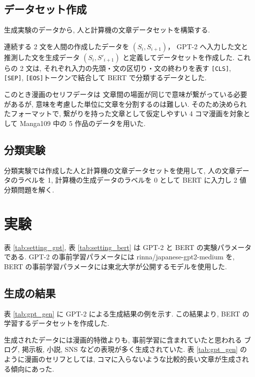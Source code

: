 \documentclass[twocolumn]{jarticle}     %
\begin{document}
\subsection{データセット作成}

生成実験のデータから, 人と計算機の文章データセットを構築する.

連続する 2 文を人間の作成したデータを $(S_i, S_{i+1})$，
GPT-2 へ入力した文と推測した文を生成データ $(S_i, S'_{i+1})$
と定義してデータセットを作成した.
これらの 2 文は, それぞれ入力の先頭・文の区切り・文の終わりを表す \verb|[CLS]|, \verb|[SEP]|, \verb|[EOS]|トークンで結合して BERT で分類するデータとした.

このとき漫画のセリフデータは
文章間の場面が同じで意味が繋がっている必要があるが, 意味を考慮した単位に文章を分割するのは難しい.
そのため決められたフォーマットで, 繋がりを持った文章として仮定しやすい 4 コマ漫画を対象として
Manga109 中の 5 作品のデータを用いた.

\subsection{分類実験}
分類実験では作成した人と計算機の文章データセットを使用して, 人の文章データのラベルを 1, 計算機の生成データのラベルを 0 として BERT に入力し 2 値分類問題を解く.



\section{実験}

表 \ref{tab:setting_gpt}, 表 \ref{tab:setting_bert} は GPT-2 と BERT の実験パラメータである.
GPT-2 の事前学習パラメータには rinna/japanese-gpt2-medium を, BERT の事前学習パラメータには東北大学が公開するモデルを使用した.


\subsection{生成の結果}

表 \ref{tab:gpt_gen} に GPT-2 による生成結果の例を示す.
この結果より, BERT の学習するデータセットを作成した.

生成されたデータには漫画的特徴よりも, 事前学習に含まれていたと思われる ブログ, 掲示板, 小説, SNS などの表現が多く生成されていた.
表 \ref{tab:gpt_gen} のように漫画のセリフとしては, コマに入らないような比較的長い文章が生成される傾向にあった.
\end{document}
